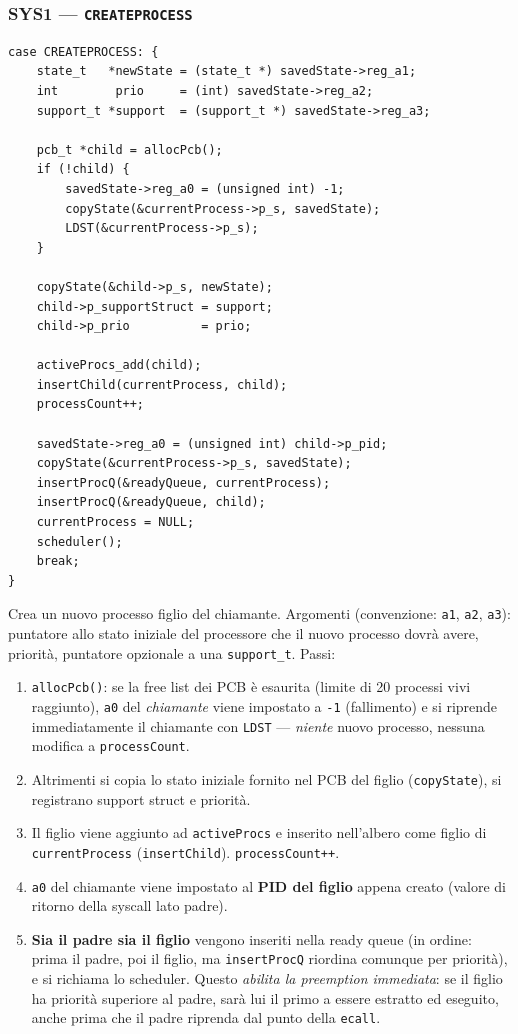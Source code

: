 \documentclass[11pt,a4paper]{article}
\newcommand{\code}[1]{\texttt{#1}}
\begin{document}
\subsubsection{SYS1 --- \code{CREATEPROCESS}}
\begin{lstlisting}
case CREATEPROCESS: {
    state_t   *newState = (state_t *) savedState->reg_a1;
    int        prio     = (int) savedState->reg_a2;
    support_t *support  = (support_t *) savedState->reg_a3;

    pcb_t *child = allocPcb();
    if (!child) {
        savedState->reg_a0 = (unsigned int) -1;
        copyState(&currentProcess->p_s, savedState);
        LDST(&currentProcess->p_s);
    }

    copyState(&child->p_s, newState);
    child->p_supportStruct = support;
    child->p_prio          = prio;

    activeProcs_add(child);
    insertChild(currentProcess, child);
    processCount++;

    savedState->reg_a0 = (unsigned int) child->p_pid;
    copyState(&currentProcess->p_s, savedState);
    insertProcQ(&readyQueue, currentProcess);
    insertProcQ(&readyQueue, child);
    currentProcess = NULL;
    scheduler();
    break;
}
\end{lstlisting}
Crea un nuovo processo figlio del chiamante. Argomenti (convenzione: \code{a1},
\code{a2}, \code{a3}): puntatore allo stato iniziale del processore che il
nuovo processo dovrà avere, priorità, puntatore opzionale a una
\code{support\_t}. Passi:
\begin{enumerate}
\item \code{allocPcb()}: se la free list dei PCB è esaurita (limite di 20
  processi vivi raggiunto), \code{a0} del \emph{chiamante} viene impostato a
  \code{-1} (fallimento) e si riprende immediatamente il chiamante con
  \code{LDST} --- \emph{niente} nuovo processo, nessuna modifica a
  \code{processCount}.
\item Altrimenti si copia lo stato iniziale fornito nel PCB del figlio
  (\code{copyState}), si registrano support struct e priorità.
\item Il figlio viene aggiunto ad \code{activeProcs} e inserito nell'albero
  come figlio di \code{currentProcess} (\code{insertChild}).
  \code{processCount++}.
\item \code{a0} del chiamante viene impostato al \textbf{PID del figlio}
  appena creato (valore di ritorno della syscall lato padre).
\item \textbf{Sia il padre sia il figlio} vengono inseriti nella ready
  queue (in ordine: prima il padre, poi il figlio, ma \code{insertProcQ}
  riordina comunque per priorità), e si richiama lo scheduler. Questo
  \emph{abilita la preemption immediata}: se il figlio ha priorità
  superiore al padre, sarà lui il primo a essere estratto ed eseguito,
  anche prima che il padre riprenda dal punto della \code{ecall}.
\end{enumerate}
\end{document}
